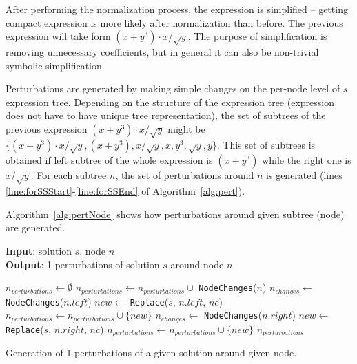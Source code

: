 \documentclass[a4paper,12pt]{elsarticle}
\begin{document}
After performing the normalization process, the expression is simplified -- getting compact expression is more likely after normalization than before. The previous expression will take form $(x+y^3)\cdot x/\sqrt{y}$. The purpose of simplification is removing unnecessary coefficients, but in general it can also be non-trivial symbolic simplification. 


Perturbations are generated by making simple changes on the per-node level of $s$ expression tree.
Depending on the structure of the expression tree (expression does not have to have unique tree representation), the set of subtrees of the previous expression $(x+y^3)\cdot x/\sqrt{y}$ might be $\{(x+y^3)\cdot x/\sqrt{y}, (x+y^3), x/\sqrt{y}, x, y^3, \sqrt{y}, y\}$. This set of subtrees is obtained if left subtree of the whole expression is $(x+y^3)$ while the right one is $x/\sqrt{y}$. 
For each subtree $n$, the set of perturbations around $n$ is generated (lines \ref{line:forSSStart}-\ref{line:forSSEnd} of Algorithm~\ref{alg:pert}).   


Algorithm~\ref{alg:pertNode} shows how perturbations around given subtree (node) are generated.

\begin{algorithm}	
	\hspace*{\algorithmicindent} \textbf{Input}: solution $s$, node $n$\\
	\hspace*{\algorithmicindent} \textbf{Output}: 1-perturbations of solution $s$ around node $n$
	\begin{algorithmic}[1]
		\State $n_{perturbations} \gets \emptyset$
		 \label{alg:alg4-case-1}
		\State $n_{perturbations} \gets n_{perturbations} \cup$ \texttt{NodeChanges}($n$)
		\EndIf
		\label{alg:alg4-case-2}
		\State $n_{changes} \gets$ \texttt{NodeChanges}($n.left$)
		\State $new \gets$ \texttt{Replace}($s$, $n.left$, $nc$)
		\State $n_{perturbations} \gets n_{perturbations} \cup \{new\}$
		\EndFor
		\EndIf
		\label{alg:alg4-case-3}
		\State $n_{changes} \gets$ \texttt{NodeChanges}($n.right$)
		\State $new \gets$ \texttt{Replace}($s$, $n.right$, $nc$)
		\State $n_{perturbations} \gets n_{perturbations} \cup \{new\}$
		\EndFor
		\EndIf
		\State \Return $n_{perturbations}$
		\EndProcedure
	\end{algorithmic}
	\caption{Generation of 1-perturbations of a given solution around given node.}
	\label{alg:pertNode}
\end{algorithm}
\end{document}
